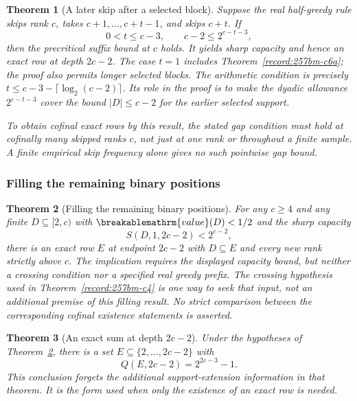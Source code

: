 \documentclass[11pt]{article}
\theoremstyle{plain}
\newtheorem{thm}{Theorem}[section]
\theoremstyle{definition}
\theoremstyle{remark}
\renewcommand{\mathrm}[1]{\ifmmode\breakablemathrm{#1}\else\textrm{#1}\fi}%
\begin{document}
\begin{thm}[A later skip after a selected block]\label{record:257bm-c6b}
Suppose the real half-greedy rule skips rank $c$, takes
$c+1,\ldots,c+t-1$, and skips $c+t$.  If
\[
 0<t\le c-3,\qquad c-2\le2^{c-t-3},
\]
then the precritical suffix bound at $c$ holds.  It yields sharp
capacity and hence an exact row at depth $2c-2$.
The case $t=1$ includes Theorem~\ref{record:257bm-c6a}; the proof
also permits longer selected blocks.  The arithmetic condition is
precisely $t\le c-3-\lceil\log_2(c-2)\rceil$.
Its role in the proof is to make the dyadic allowance $2^{c-t-3}$
cover the bound $|D|\le c-2$ for the earlier selected support.

To obtain cofinal exact rows by this result, the stated gap condition
must hold at cofinally many skipped ranks $c$, not just at one rank
or throughout a finite sample.  A finite empirical skip frequency
alone gives no such pointwise gap bound.
\end{thm}

\subsubsection*{Filling the remaining binary positions}

\begin{thm}[Filling the remaining binary positions]\label{record:257bm-c7}
For any $c\ge4$ and any finite $D\subseteq[2,c)$ with $\mathrm{value}(D)<1/2$ and the sharp
capacity
\[
\ensuremath{S}(D,1,2c-2) < 2^{c-2},
\]
there is an exact row $E$ at endpoint $2c-2$ with $D\subseteq E$ and every new rank strictly
above $c$. The implication requires the displayed capacity bound,
but neither a crossing condition nor a specified real greedy prefix.
The crossing hypothesis used in Theorem~\ref{record:257bm-c4} is
one way to seek that input, not an additional premise of this filling
result.  No strict comparison between the corresponding cofinal
existence statements is asserted.
\end{thm}

\begin{thm}[An exact sum at depth $2c-2$]\label{record:257bm-c8}
Under the hypotheses of Theorem~\ref{record:257bm-c7}, there is a
set $E\subseteq\{2,\ldots,2c-2\}$ with
\[
 Q(E,2c-2)=2^{2c-3}-1.
\]
This conclusion forgets the additional support-extension information
in that theorem.  It is the form used when only the existence of an
exact row is needed.
\end{thm}
\end{document}
